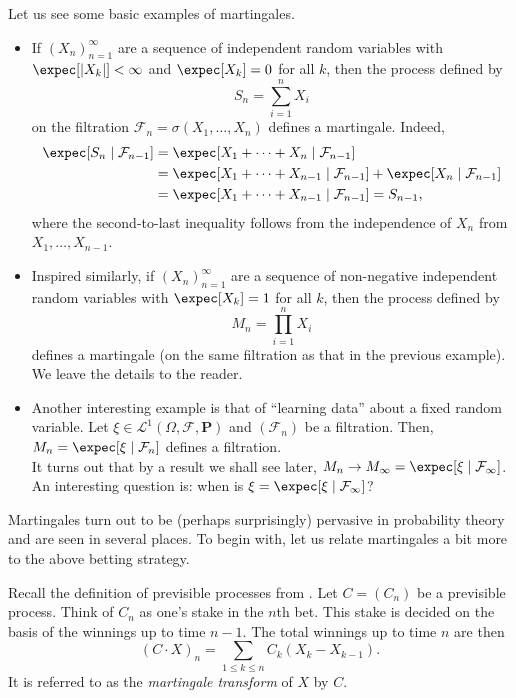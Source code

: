 		Let us see some basic examples of martingales.\\

		\begin{itemize}
			\item If $(X_n)_{n=1}^\infty$ are a sequence of independent random variables with $\expec[|X_k|] < \infty$ and $\expec[X_k] = 0$ for all $k$, then the process defined by
			\[ S_n = \sum_{i=1}^n X_i \]
			on the filtration $\mathcal{F}_n = \sigma(X_1,\ldots,X_n)$ defines a martingale. Indeed,
			\begin{align*}
				\expec[S_n \mid \mathcal{F}_{n-1}] &= \expec[X_1 + \cdots + X_n \mid \mathcal{F}_{n-1}] \\
					&= \expec[X_1 + \cdots + X_{n-1} \mid \mathcal{F}_{n-1}] + \expec[X_n \mid \mathcal{F}_{n-1}] \\
					&= \expec[X_1 + \cdots + X_{n-1} \mid \mathcal{F}_{n-1}] = S_{n-1},	
			\end{align*}
			where the second-to-last inequality follows from the independence of $X_n$ from $X_1,\ldots,X_{n-1}$.

			\item Inspired similarly, if $(X_n)_{n=1}^\infty$ are a sequence of non-negative independent random variables with $\expec[X_k] = 1$ for all $k$, then the process defined by
			\[ M_n = \prod_{i=1}^n X_i \]
			defines a martingale (on the same filtration as that in the previous example). We leave the details to the reader.

			\item Another interesting example is that of ``learning data'' about a fixed random variable. Let $\xi \in \mathcal{L}^1(\Omega,\mathcal{F},\textbf{P})$ and $(\mathcal{F}_n)$ be a filtration. Then, $M_n = \expec[\xi \mid \mathcal{F}_n]$ defines a filtration.\\
			It turns out that by a result we shall see later, $M_n \to M_\infty = \expec[\xi \mid \mathcal{F}_\infty]$. An interesting question is: when is $\xi = \expec[\xi \mid \mathcal{F}_\infty]$?
		\end{itemize}
	
		Martingales turn out to be (perhaps surprisingly) pervasive in probability theory and are seen in several places. To begin with, let us relate martingales a bit more to the above betting strategy.

		Recall the definition of previsible processes from . Let $C = (C_n)$ be a previsible process. Think of $C_n$ as one's stake in the $n$th bet. This stake is decided on the basis of the winnings up to time $n-1$. The total winnings up to time $n$ are then
		\[ (C \cdot X)_n = \sum_{1 \le k \le n} C_k (X_k - X_{k-1}). \]
		It is referred to as the \emph{martingale transform} of $X$ by $C$.

